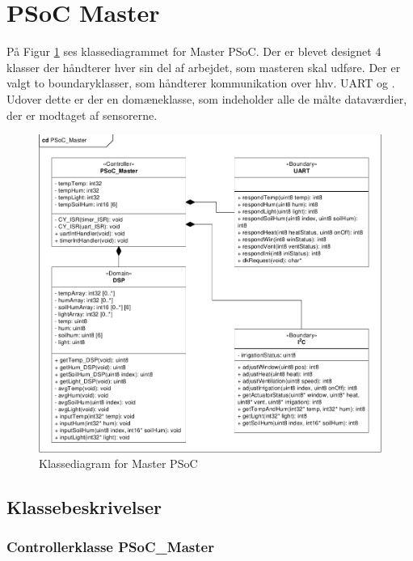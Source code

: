 \section{PSoC Master} \label{sec:PSoC_Master_design}

På Figur \ref{fig:Master_PSoC_klassediagram} ses klassediagrammet for Master PSoC. Der er blevet designet 4 klasser der håndterer hver sin del af arbejdet, som masteren skal udføre. Der er valgt to boundaryklasser, som håndterer kommunikation over hhv. UART og \IIC. Udover dette er der en domæneklasse, som indeholder alle de målte dataværdier, der er modtaget af sensorerne. 

\begin{figure}[h]
\centering 
\includegraphics[width={\textwidth}, trim=0 0 0 0, clip=true] {../fig/cd_PSoC_master.pdf}
\caption{Klassediagram for Master PSoC}
\label{fig:Master_PSoC_klassediagram}
\end{figure}

\clearpage

\subsection{Klassebeskrivelser}

\subsubsection{Controllerklasse PSoC\_Master}

